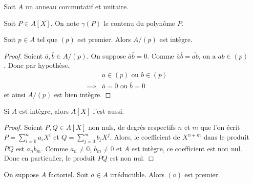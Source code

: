 





  Soit $A$ un anneau commutatif et unitaire.

  \begin{notation}
    Soit $P \in A[X]$. On note $\gamma(P)$ le contenu du polynôme $P$.
  \end{notation}


  \begin{lemma}
    \label{critere-d-eisenstein-1}
    Soit $p \in A$ tel que $(p)$ est premier. Alors $A/(p)$ est intègre.
  \end{lemma}

  \begin{proof}
    Soient $\overline{a}, \overline{b} \in A/(p)$. On suppose $\overline{a} \overline{b} = 0$. Comme $\overline{a} \overline{b} = \overline{ab}$, on a $ab \in (p)$. Donc par hypothèse,
    \begin{align*}
      &a \in (p) \text{ ou } b \in (p) \\
      \implies& \overline{a} = 0 \text{ ou } \overline{b} = 0
    \end{align*}
    et ainsi $A/(p)$ est bien intègre.
  \end{proof}


  \begin{lemma}
    \label{critere-d-eisenstein-2}
    Si $A$ est intègre, alors $A[X]$ l'est aussi.
  \end{lemma}

  \begin{proof}
    Soient $P, Q \in A[X]$ non nuls, de degrés respectifs $n$ et $m$ que l'on écrit $P = \sum_{i=0}^n a_i X^i$ et $Q = \sum_{j=0}^m b_j X^j$. Alors, le coefficient de $X^{n+m}$ dans le produit $PQ$ est $a_n b_m$. Comme $a_n \neq 0$, $b_m \neq 0$ et $A$ est intègre, ce coefficient est non nul. Donc en particulier, le produit $PQ$ est non nul.
  \end{proof}


  \begin{lemma}
    \label{critere-d-eisenstein-3}
    On suppose $A$ factoriel. Soit $a \in A$ irréductible. Alors $(a)$ est premier.
  \end{lemma}

